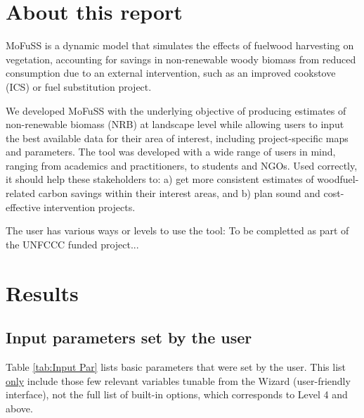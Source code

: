 \documentclass[english,a4paper,11pt,twoside]{report}
\def\chaptername{Chapter}
\begin{document}
 	

\tableofcontents
\renewcommand{\chaptername}{}  %
\newpage
	
\chapter{About this report} \label{ch:Intro}
MoFuSS is a dynamic model that simulates the effects of fuelwood harvesting on vegetation, accounting for savings in non-renewable woody biomass from reduced consumption due to an external intervention, such as an improved cookstove (ICS) or fuel substitution project.

We developed MoFuSS with the underlying objective of producing estimates of non-renewable biomass (NRB) at landscape level while allowing users to input the best available data for their area of interest, including project-specific maps and parameters. The tool was developed with a wide range of users in mind, ranging from academics and practitioners, to students and NGOs. Used correctly, it should help these stakeholders to: a) get more consistent estimates of woodfuel-related carbon savings within their interest areas, and b) plan sound and cost-effective intervention projects.

The user has various ways or levels to use the tool: To be completted as part of the UNFCCC funded project...


\chapter{Results} \label{ch:Results}
\section{Input parameters set by the user} \label{sec:Input Par}
Table \ref{tab:Input Par} lists basic parameters that were set by the user. This list \underline{only} include those few relevant variables tunable from the Wizard (user-friendly interface), not the full list of built-in options, which corresponds to Level 4 and above.
\end{document}
